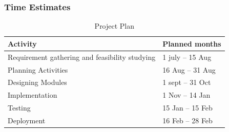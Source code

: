 \documentclass[oneside,a4paper,12pt]{report}
\begin{document}
\subsubsection{Time Estimates}

\begin{table}[!htbp]
\begin{center}
\def\arraystretch{1.5}
\begin{tabularx}{\textwidth}{| X | X |}
\hline
Activity	& Planned months\\
\hline
Requirement gathering and feasibility studying        &1 july – 15 Aug\\
\hline
Planning Activities       &16 Aug – 31 Aug\\
\hline
Designing Modules        &1 sept – 31 Oct\\
\hline
Implementation           &1 Nov – 14 Jan\\
\hline
Testing                  &15 Jan – 15 Feb\\
\hline
Deployment               &16 Feb – 28 Feb\\
\hline



\end{tabularx}
\end{center}
\caption{Project Plan}
\label{tab:usecase}
\end{table}
\newpage
\end{document}

